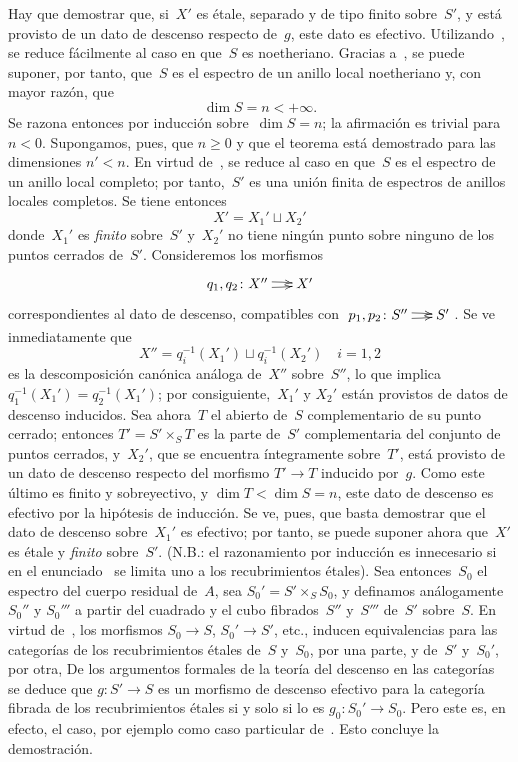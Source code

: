 Hay que demostrar que, si~$X'$ es étale, separado y de tipo finito
sobre~$S'$, y está provisto de un dato de descenso respecto de~$g$, este
dato es efectivo. Utilizando~, se reduce fácilmente al caso en
que~$S$ es noetheriano. Gracias a~, se puede suponer, por
tanto, que~$S$ es el espectro de un anillo local noetheriano y, con mayor
razón, que
$$
\dim S=n<+\infty.
$$
Se razona entonces por inducción sobre~$\dim S=n$; la afirmación es trivial
para $n<0$. Supongamos, pues, que $n\geq 0$ y que el teorema está
demostrado para las dimensiones $n'<n$. En virtud de~, se
reduce al caso en que~$S$ es el espectro de un anillo local completo; por
tanto,~$S'$ es una unión finita de espectros de anillos locales completos.
Se tiene entonces
$$
X'=X_1'\sqcup X_2'
$$
donde~$X_1'$ es \emph{finito} sobre~$S'$ y~$X_2'$ no tiene ningún punto
sobre ninguno de los puntos cerrados
de~$S'$. Consideremos los morfismos
$$
\xymatrix@C=.5cm{ q_1,q_2\colon X'' \ar@/^2pt/[r] \ar@/_2pt/[r] & X' }
$$
correspondientes al dato de descenso, compatibles con
$\xymatrix@C=.5cm{p_1,p_2\colon S'' \ar@/^2pt/[r] \ar@/_2pt/[r] & S'}$.
Se ve inmediatamente que
$$
X''=q_i^{-1}(X_1')\sqcup q_i^{-1}(X_2')\quad i=1,2
$$
es la descomposición canónica análoga de~$X''$ sobre~$S''$, lo que implica
$q_1^{-1}(X_1')=\allowbreak q_2^{-1}(X_1')$; por consiguiente,~$X_1'$ y
$X_2'$ están provistos de datos de descenso inducidos. Sea ahora~$T$ el
abierto de~$S$ complementario de su punto cerrado; entonces
$T'=S'\times_S T$ es la parte de~$S'$ complementaria del conjunto de
puntos cerrados, y~$X_2'$, que se encuentra íntegramente sobre~$T'$, está
provisto de un dato de descenso respecto del morfismo $T'\to T$ inducido
por~$g$. Como este último es finito y sobreyectivo, y
$\dim T<\dim S=n$, este dato de descenso es efectivo por la hipótesis de
inducción. Se ve, pues, que basta demostrar que el dato de descenso
sobre~$X_1'$ es efectivo; por tanto, se puede suponer ahora que~$X'$ es
étale y \emph{finito} sobre~$S'$. (N.B.: el razonamiento por inducción es
innecesario si en el enunciado~ se limita uno a los
recubrimientos étales). Sea entonces~$S_0$ el espectro del cuerpo residual
de~$A$, sea $S_0'=S'\times_S S_0$, y definamos análogamente~$S_0''$ y
$S_0'''$ a partir del cuadrado y el cubo fibrados~$S''$ y~$S'''$ de~$S'$
sobre~$S$. En virtud de~, los morfismos $S_0\to S$,
$S_0'\to S'$, etc., inducen equivalencias para las categorías de los
recubrimientos étales de~$S$ y~$S_0$, por una parte, y de~$S'$ y~$S_0'$,
por otra,  De los argumentos
formales de la teoría del descenso en las categorías~\cite{IX.D} se deduce
que $g\colon S'\to S$ es un morfismo de descenso efectivo para la
categoría fibrada de los recubrimientos étales si y solo si lo es
$g_0\colon S_0'\to S_0$. Pero este es, en efecto, el caso, por ejemplo
como caso particular de~. Esto concluye la demostración.


